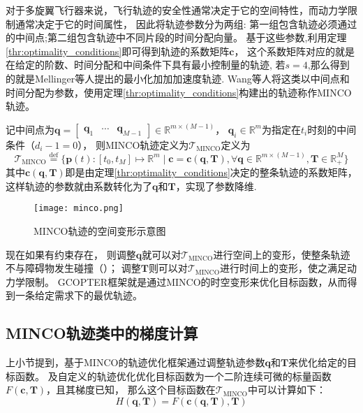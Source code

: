 对于多旋翼飞行器来说，飞行轨迹的安全性通常决定于它的空间特性，而动力学限制通常决定于它的时间属性，
因此将轨迹参数分为两组:
第一组包含轨迹必须通过的中间点;第二组包含轨迹中不同片段的时间分配向量。
基于这些参数,利用定理\ref{thr:optimality_conditions}即可得到轨迹的系数矩阵$\bm{c}$，
这个系数矩阵对应的就是在给定的阶数、时间分配和中间条件下具有最小控制量的轨迹,
若$s=4$,那么得到的就是Mellinger等人提出的最小化加加加速度轨迹\cite{2011minimumsnap}.
Wang等人将这类以中间点和时间分配为参数，使用定理\ref{thr:optimality_conditions}构建出的轨迹称作MINCO轨迹\cite{2021Geometrically}。

记中间点为$\bm{q} = \begin{bmatrix} \bm{q}_1 & \cdots & \bm{q}_{M-1} \end{bmatrix} \in \mathbb{R}^{m \times (M-1)}$，
$\bm{q}_i \in \mathbb{R}^m$为指定在$t_i$时刻的中间条件（$d_i-1=0$），
则MINCO轨迹定义为$\mathscr{T}_{\text{MINCO}}$定义为
\begin{equation}
  \mathscr{T}_{\text{MINCO}} \overset{\text{def}}{=} 
  \{
    \bm{p}(t):[t_0, t_M] \mapsto \mathbb{R}^m \mid \bm{c} = \bm{c}(\bm{q}, \bm{T}), \forall \bm{q} \in \mathbb{R}^{m \times (M-1)}, \bm{T} \in \mathbb{R}_+^{M}
  \}
  \label{equ:definition_of_minco}
\end{equation}
其中$\bm{c}(\bm{q}, \bm{T})$即是由定理\ref{thr:optimality_conditions}决定的整条轨迹的系数矩阵，
这样轨迹的参数就由系数转化为了$\bm{q}$和$\bm{T}$，实现了参数降维.

\begin{figure}[ht]
  \centering
  \texttt{[image: minco.png]}
  \caption{MINCO轨迹的空间变形示意图}
  \label{fig:minco}
\end{figure}

现在如果有约束存在，
则调整$\bm{q}$就可以对$\mathscr{T}_{\text{MINCO}}$进行空间上的变形，使整条轨迹不与障碍物发生碰撞（）；
调整$\bm{T}$则可以对$\mathscr{T}_{\text{MINCO}}$进行时间上的变形，使之满足动力学限制。
GCOPTER框架就是通过MINCO的时空变形来优化目标函数，从而得到一条给定需求下的最优轨迹。

\subsection{MINCO轨迹类中的梯度计算}\label{subsec:gradient_calculation_in_minco}
上小节提到，基于MINCO的轨迹优化框架通过调整轨迹参数$\bm{q}$和$\bm{T}$来优化给定的目标函数。
及自定义的轨迹优化优化目标函数为一个二阶连续可微的标量函数$F(\bm{c}, \bm{T})$，且其梯度已知，
那么这个目标函数在$\mathscr{T}_{\text{MINCO}}$中可以计算如下：
\begin{equation}
  H(\bm{q}, \bm{T}) = F(\bm{c}(\bm{q}, \bm{T}), \bm{T})
  \label{equ:objective_form_in_minco}
\end{equation}

